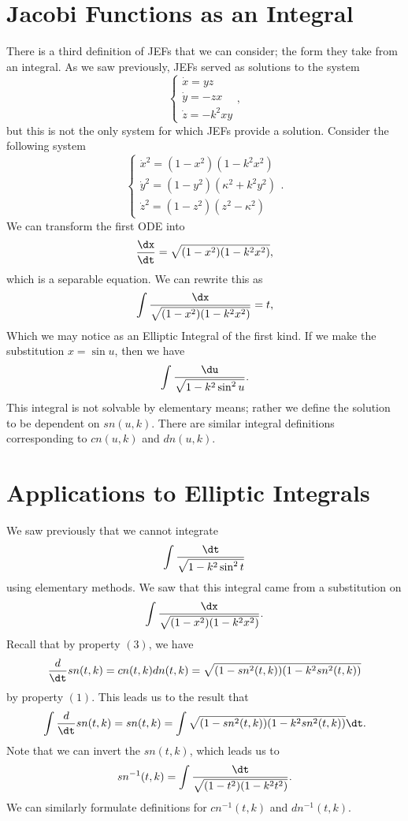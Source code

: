 \documentclass[notitlepage]{hw}
\begin{document}
\section{Jacobi Functions as an Integral}

There is a third definition of JEFs that we can consider; the form they take from an integral. As we
saw previously, JEFs served as solutions to the system
\[
\begin{cases}
\dot{x}=yz\\
\dot{y}=-zx\\
\dot{z}=-k^{2}xy
\end{cases},
\]
but this is not the only system for which JEFs provide a solution. Consider the following system
\[
\begin{cases}
\dot{x}^{2}=(1-x^{2})(1-k^{2}x^{2})\\
\dot{y}^{2}=(1-y^{2})(\kappa^{2}+k^{2}y^{2})\\
\dot{z}^{2}=(1-z^{2})(z^{2}-\kappa^{2})
\end{cases}.
\]
We can transform the first ODE into
\[
{\dx\over\dt}=\sqrt{(1-x^{2})(1-k^{2}x^{2})},
\]
which is a separable equation. We can rewrite this as
\[
\int{\dx\over\sqrt{(1-x^{2})(1-k^{2}x^{2})}}=t,
\]
Which we may notice as an Elliptic Integral of the first kind. If we make the substitution
$x=\sin{u}$, then we have
\[
\int{\du\over\sqrt{1-k^{2}\sin^{2}{u}}}.
\]
This integral is not solvable by elementary means; rather we define the solution to be dependent on
$sn(u,k)$. There are similar integral definitions corresponding to $cn(u,k)$ and $dn(u,k)$.

\section{Applications to Elliptic Integrals}

We saw previously that we cannot integrate
\[
\int{\dt\over\sqrt{1-k^{2}\sin^{2}{t}}}
\]
using elementary methods. We saw that this integral came from a substitution on
\[
\int{\dx\over\sqrt{(1-x^{2})(1-k^{2}x^{2})}}.
\]
Recall that by property $(3)$, we have
\[
{d\over\dt}sn(t,k)=cn(t,k)dn(t,k)=\sqrt{(1-sn^{2}(t,k))(1-k^{2}sn^{2}(t,k))}
\]
by property $(1)$. This leads us to the result that
\[
\int{d\over\dt}sn(t,k)=sn(t,k)=\int\sqrt{(1-sn^{2}(t,k))(1-k^{2}sn^{2}(t,k))}\dt.
\]
Note that we can invert the $sn(t,k)$, which leads us to
\[
sn^{-1}(t,k)=\int{\dt\over\sqrt{(1-t^{2})(1-k^{2}t^{2})}}.
\]
We can similarly formulate definitions for $cn^{-1}(t,k)$ and $dn^{-1}(t,k)$.
\end{document}
